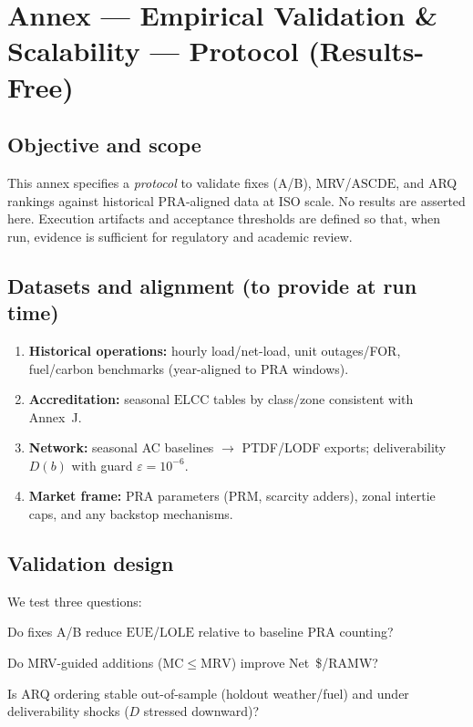\documentclass[11pt]{article}
\newcommand{\annexsection}[1]{\section{Annex \thesection{} — #1}}
\newcommand{\ELCC}{\ensuremath{\mathrm{ELCC}}}
\newcommand{\EUE}{\ensuremath{\mathrm{EUE}}}
\newcommand{\LOLE}{\ensuremath{\mathrm{LOLE}}}
\newcommand{\ASCDE}{\ensuremath{\mathrm{ASCDE}}}
\newcommand{\MRV}{\ensuremath{\mathrm{MRV}}}
\newcommand{\MC}{\ensuremath{\mathrm{MC}}}
\numberwithin{equation}{section}
\theoremstyle{definition}
\theoremstyle{remark}
\begin{document}
\annexsection{Empirical Validation \& Scalability --- Protocol (Results-Free)}
\label{annex:T}

\subsection{Objective and scope}
This annex specifies a \emph{protocol} to validate fixes (A/B), MRV/\ASCDE{}, and ARQ rankings against historical PRA-aligned data at ISO scale. No results are asserted here. Execution artifacts and acceptance thresholds are defined so that, when run, evidence is sufficient for regulatory and academic review.

\subsection{Datasets and alignment (to provide at run time)}
\begin{enumerate}[leftmargin=1.2em]
  \item \textbf{Historical operations:} hourly load/net-load, unit outages/FOR, fuel/carbon benchmarks (year-aligned to PRA windows).
  \item \textbf{Accreditation:} seasonal \ELCC{} tables by class/zone consistent with Annex~J.
  \item \textbf{Network:} seasonal AC baselines $\to$ PTDF/LODF exports; deliverability $D(b)$ with guard $\varepsilon=10^{-6}$.
  \item \textbf{Market frame:} PRA parameters (PRM, scarcity adders), zonal intertie caps, and any backstop mechanisms.
\end{enumerate}

\subsection{Validation design}
We test three questions:
\begin{description}[leftmargin=1.2em,labelsep=0.5em]
  \item[Q1 (Reliability):] Do fixes A/B reduce \EUE{}/\LOLE{} relative to baseline PRA counting?
  \item[Q2 (Economic):] Do MRV-guided additions ($\MC \le \MRV$) improve Net~\$/RA\text{-}MW?
  \item[Q3 (Ranking):] Is ARQ ordering stable out-of-sample (holdout weather/fuel) and under deliverability shocks ($D$ stressed downward)?
\end{description}
\end{document}
